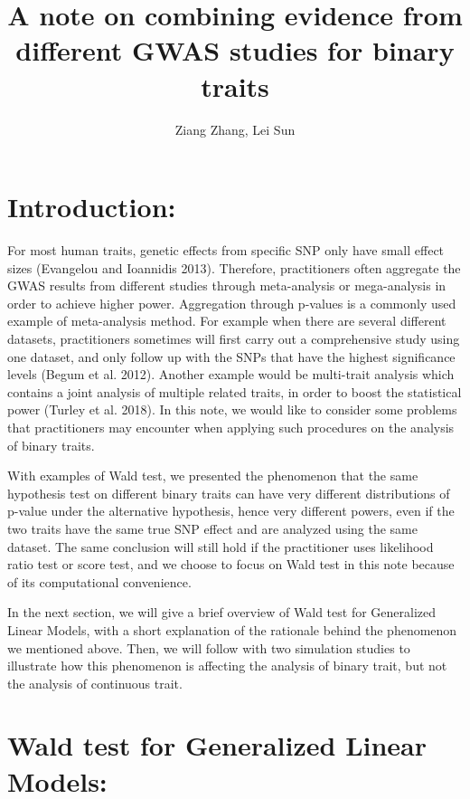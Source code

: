 \documentclass[
]{article}
\title{\textbf{A note on combining evidence from different GWAS studies for
binary traits}}
\author{Ziang Zhang, Lei Sun}
\date{}
\begin{document}
\maketitle

\newcommand{\p}{\text{P}}
\newcommand{\E}{\mathbb{E}}
\newcommand{\Var}{\text{Var}}

\hypertarget{introduction}{%
\section{Introduction:}\label{introduction}}

For most human traits, genetic effects from specific SNP only have small
effect sizes (Evangelou and Ioannidis 2013). Therefore, practitioners
often aggregate the GWAS results from different studies through
meta-analysis or mega-analysis in order to achieve higher power.
Aggregation through p-values is a commonly used example of meta-analysis
method. For example when there are several different datasets,
practitioners sometimes will first carry out a comprehensive study using
one dataset, and only follow up with the SNPs that have the highest
significance levels (Begum et al. 2012). Another example would be
multi-trait analysis which contains a joint analysis of multiple related
traits, in order to boost the statistical power (Turley et al. 2018). In
this note, we would like to consider some problems that practitioners
may encounter when applying such procedures on the analysis of binary
traits.

With examples of Wald test, we presented the phenomenon that the same
hypothesis test on different binary traits can have very different
distributions of p-value under the alternative hypothesis, hence very
different powers, even if the two traits have the same true SNP effect
and are analyzed using the same dataset. The same conclusion will still
hold if the practitioner uses likelihood ratio test or score test, and
we choose to focus on Wald test in this note because of its
computational convenience.

In the next section, we will give a brief overview of Wald test for
Generalized Linear Models, with a short explanation of the rationale
behind the phenomenon we mentioned above. Then, we will follow with two
simulation studies to illustrate how this phenomenon is affecting the
analysis of binary trait, but not the analysis of continuous trait.

\hypertarget{wald-test-for-generalized-linear-models}{%
\section{Wald test for Generalized Linear
Models:}\label{wald-test-for-generalized-linear-models}}
\end{document}
